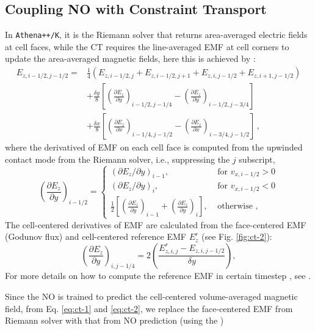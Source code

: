 \documentclass{article}
\newcommand{\hywcom}[1]{{\color{purple}{[HYW: #1]}}}
\begin{document}
\subsection{Coupling NO with Constraint Transport}
In \texttt{Athena++/K}, it is the Riemann solver that returns area-averaged electric fields at cell faces, while the CT requires the line-averaged EMF at cell corners to update the area-averaged magnetic fields, here this is achieved by \cite{Gardiner:2005JCoPh.205..509G,Gardiner2008,Stone:2008mh}:
\begin{align}
E_{z, i-1 / 2, j-1 / 2}= 
&\frac{1}{4}\left(E_{z, i-1 / 2, j}+E_{z, i-1 / 2, j+1}+E_{z, i, j-1 / 2}+E_{z, i+1, j-1 / 2}\right) \\
&+\frac{\delta y}{8}\left[\left(\frac{\partial E_z}{\partial y}\right)_{i-1 / 2, j-1 / 4}-\left(\frac{\partial E_z}{\partial y}\right)_{i-1 / 2, j-3 / 4}\right] \\
&+\frac{\delta x}{8}\left[\left(\frac{\partial E_z}{\partial x}\right)_{i-1 / 4, j-1 / 2}-\left(\frac{\partial E_z}{\partial x}\right)_{i-3 / 4, j-1 / 2}\right] \,,  \label{eq:ct-1}
\end{align}
where the derivatived of EMF on each cell face is computed from the upwinded contact mode from the Riemann solver, i.e., suppressing the $j$ subscript,
\begin{equation}
\left(\frac{\partial E_z}{\partial y}\right)_{i-1 / 2}= 
\begin{cases}
\left(\partial E_z / \partial y\right)_{i-1}, & \text { for } v_{x, i-1 / 2}>0 \\ 
\left(\partial E_z / \partial y\right)_i, & \text { for } v_{x, i-1 / 2}<0 \\ 
\frac{1}{2}\left[\left(\frac{\partial E_z}{\partial y}\right)_{i-1}+\left(\frac{\partial E_z}{\partial y}\right)_i\right], & \text { otherwise },
\end{cases}
\end{equation}
The cell-centered derivatives of EMF are calculated from the face-centered EMF (Godunov flux) and cell-centered reference EMF $E^r_z$ (see Fig. \ref{fig:ct-2}):
\begin{equation}
\left(\frac{\partial E_z}{\partial y}\right)_{i, j-1 / 4}=2\left(\frac{E_{z, i, j}^r-E_{z, i, j-1 / 2}}{\delta y}\right), \label{eq:ct-2}
\end{equation}
For more details on how to compute the reference EMF in certain timestep \hywcom{refine the description here}, see \cite{Stone:2008mh}. 

Since the NO is trained to predict the cell-centered volume-averaged magnetic field, from Eq. \ref{eq:ct-1} and \ref{eq:ct-2}, we replace the face-centered EMF from Riemann solver with that from NO prediction (using the )
\end{document}
